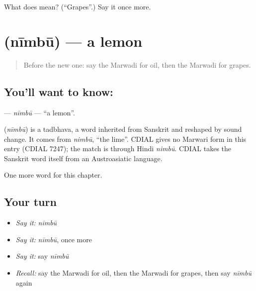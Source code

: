 \begin{tcolorbox}[breakable,colback=teal!4,colframe=teal!35!black,title={Before you move on}]
What does  mean? (\textquotedblleft{}Grapes\textquotedblright{}.) Say it once more.
\end{tcolorbox}
\section[\texorpdfstring{\mw{नींबू} (nīmbū)}{नींबू (nīmbū)}]{ (nīmbū) — a lemon}

\label{lesson:MW-C61-nimbu}



\begin{quote}
Before the new one: say the Marwadi for oil, then the Marwadi for grapes.
\end{quote}

\subsection*{You'll want to know: }
\textbf{} — \emph{nīmbū} — \textquotedblleft{}a lemon\textquotedblright{}.

\begin{cousinweb}
\textbf{} (\emph{nīmbū}) is a tadbhava, a word inherited from Sanskrit and reshaped by sound change. It comes from \emph{nimbū}, \textquotedblleft{}the lime\textquotedblright{}. CDIAL gives no Marwari form in this entry (CDIAL 7247); the match is through Hindi \emph{nimbū}. CDIAL takes the Sanskrit word itself from an Austroasiatic language.
\end{cousinweb}

\begin{grammarlens}[title={What you've built}]
One more word for this chapter.
\end{grammarlens}

\subsection*{Your turn}
\begin{itemize}
\raggedright
  \item \emph{Say it:} \emph{nīmbū}
  \item \emph{Say it:} \emph{nīmbū}, once more
  \item \emph{Say it:} say \emph{nīmbū}
  \item \emph{Recall:} say the Marwadi for oil, then the Marwadi for grapes, then say \emph{nīmbū} again
\end{itemize}

